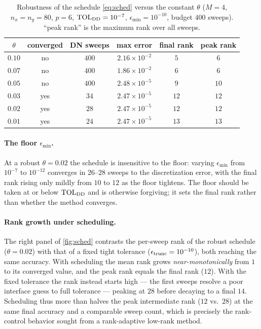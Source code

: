 \documentclass[hidelinks,onefignum,onetabnum]{siamart250211}
\newcommand{\TOL}{\mathrm{TOL}}
\begin{document}
\begin{table}[htb]
\caption{Robustness of the schedule \cref{eq:sched} versus the constant $\theta$
($M=4$, $n_x=n_y=80$, $p=6$, $\TOL_{\rm DD}=10^{-7}$, $\epsilon_{\min}=10^{-10}$,
budget $400$ sweeps).  ``peak rank'' is the maximum rank over all sweeps.
\label{tab:theta}}
\begin{center}
\begin{tabular}{c c c c c c}
\toprule
$\theta$ & converged & DN sweeps & max error & final rank & peak rank \\
\midrule
$0.10$ & no  & $400$ & $2.16\times10^{-2}$ & $5$  & $6$  \\
$0.07$ & no  & $400$ & $1.86\times10^{-2}$ & $6$  & $6$  \\
$0.05$ & no  & $400$ & $2.48\times10^{-5}$ & $9$  & $10$ \\
$0.03$ & yes & $34$  & $2.47\times10^{-5}$ & $12$ & $12$ \\
$0.02$ & yes & $28$  & $2.47\times10^{-5}$ & $12$ & $12$ \\
$0.01$ & yes & $24$  & $2.47\times10^{-5}$ & $13$ & $13$ \\
\bottomrule
\end{tabular}
\end{center}
\end{table}

\paragraph{The floor $\epsilon_{\min}$.}  At a robust $\theta=0.02$ the schedule
is insensitive to the floor: varying $\epsilon_{\min}$ from $10^{-7}$ to
$10^{-12}$ converges in $26$--$28$ sweeps to the discretization error, with the
final rank rising only mildly from $10$ to $12$ as the floor tightens.  The floor
should be taken at or below $\TOL_{\rm DD}$ and is otherwise forgiving; it sets
the final rank rather than whether the method converges.

\paragraph{Rank growth under scheduling.}  The right panel of \cref{fig:sched}
contrasts the per-sweep rank of the robust schedule ($\theta=0.02$) with that of
a fixed tight tolerance ($\epsilon_{\rm trunc}=10^{-10}$), both reaching the same
accuracy.  With scheduling the mean rank grows \emph{near-monotonically} from $1$
to its converged value, and the peak rank equals the final rank ($12$).  With the
fixed tolerance the rank instead starts high --- the first sweeps resolve a poor
interface guess to full tolerance --- peaking at $28$ before decaying to a final
$14$.  Scheduling thus more than halves the peak intermediate rank ($12$ vs.\
$28$) at the same final accuracy and a comparable sweep count, which is precisely
the rank-control behavior sought from a rank-adaptive low-rank method.
\end{document}
